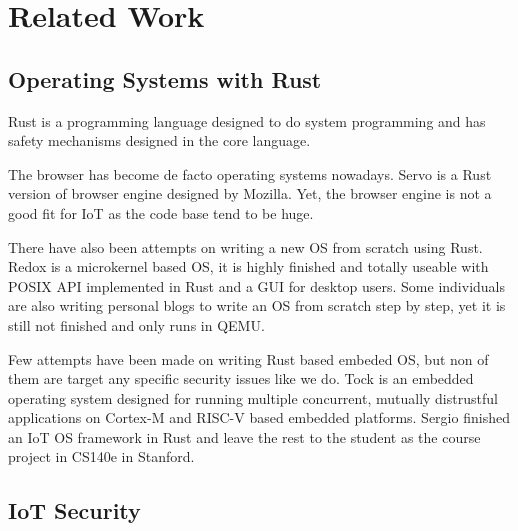 \section{Related Work}

\subsection{Operating Systems with Rust}

Rust is a programming language designed to do system programming and has safety mechanisms designed in the core language.

The browser has become de facto operating systems nowadays.
Servo\cite{Servo} is a Rust version of browser engine designed by Mozilla.
Yet, the browser engine is not a good fit for IoT as the code base tend to be huge.

There have also been attempts on writing a new OS from scratch using Rust.
Redox\cite{Redox} is a microkernel based OS, it is highly finished and totally useable with POSIX API implemented in Rust and a GUI for desktop users.
Some individuals are also writing personal blogs\cite{OsPhil} to write an OS from scratch step by step, yet it is still not finished and only runs in QEMU. 

Few attempts have been made on writing Rust based embeded OS, but non of them are target any specific security issues like we do.
Tock\cite{levy2015ownership, levy2017tock, levy2017multiprogramming} is an embedded operating system designed for running multiple concurrent, mutually distrustful applications on Cortex-M and RISC-V based embedded platforms.
Sergio finished an IoT OS framework in Rust\cite{cs140e} and leave the rest to the student as the course project in CS140e in Stanford.



\subsection{IoT Security}